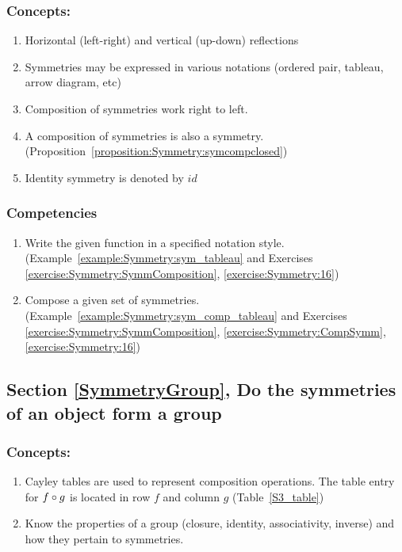 \subsubsection*{Concepts:}
\begin{enumerate}
\item
Horizontal (left-right) and vertical (up-down) reflections
\item
Symmetries may be expressed in various notations (ordered pair, tableau, arrow diagram, etc)
\item
Composition of symmetries work right to left.
\item
A composition of symmetries is also a symmetry. (Proposition~\ref{proposition:Symmetry:symcompclosed})
\item
Identity symmetry is denoted by $id$
\end{enumerate}

\subsubsection*{Competencies}
\begin{enumerate}
\item
Write the given function in a specified notation style. (Example~\ref{example:Symmetry:sym_tableau} and Exercises \ref{exercise:Symmetry:SymmComposition}, \ref{exercise:Symmetry:16})
\item
Compose a given set of symmetries. (Example~\ref{example:Symmetry:sym_comp_tableau} and Exercises \ref{exercise:Symmetry:SymmComposition}, \ref{exercise:Symmetry:CompSymm},  \ref{exercise:Symmetry:16})
\end{enumerate}


\subsection*{Section \ref{SymmetryGroup}, Do the symmetries of an object form a group}
\subsubsection*{Concepts:}
\begin{enumerate}
\item 
Cayley tables are used to represent composition operations. The table entry for $f \circ g$ is located in row $f$ and column $g$ (Table~\ref{S3_table})
\item
Know the properties of a group (closure, identity, associativity, inverse) and how they pertain to symmetries.  
\end{enumerate}

